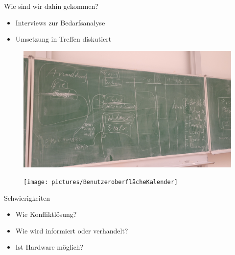 \begin{frame}{Wie sind wir dahin gekommen?}
    \begin{itemize}
        \item Interviews zur Bedarfsanalyse
        \item Umsetzung in Treffen diskutiert
    \end{itemize}
\end{frame}

\begin{frame}
    \begin{figure}
        \centering
        \includegraphics[width=0.6\linewidth]{pictures/BrainstormTafelbild}
        \label{fig: Tafelbild Brainstorm}
    \end{figure}
\end{frame}

\begin{frame}
    \begin{figure}
        \centering
        \texttt{[image: pictures/BenutzeroberflächeKalender]}
        \label{fig: Mockup Übersicht}
    \end{figure}
\end{frame}

\begin{frame}{Schwierigkeiten}
    \begin{itemize}
        \item Wie Konfliktlösung?
        \item Wie wird informiert oder verhandelt?
        \item Ist Hardware möglich?
    \end{itemize}
\end{frame}
